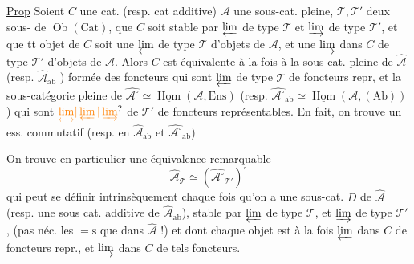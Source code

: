 \uline{Prop} Soient $C$ une cat. (resp. cat
additive) $\mathcal A$ une sous-cat. pleine,
$\mathcal T,\mathcal T'$ deux sous-
de $\operatorname{Ob}(\mathrm{Cat})$,  que $C$ soit
stable par $\varprojlim$ de type $\mathcal T$ et $\varinjlim$
de type $\mathcal T'$, et que tt objet de
$C$ soit une $\varprojlim$  de type $\mathcal T$ d'objets
de $\mathcal A$, et une $\varinjlim$ dans $C$ de type $\mathcal T'$
d'objets de $\mathcal A$. Alors $C$ est équivalente
à la fois à la sous cat. pleine
de $\widehat{\mathcal A}$ 
(resp. $\widehat{\mathcal A}_{\mathrm{ab}}$ )
formée des
foncteurs  qui sont $\varprojlim$ 
de type $\mathcal T$ de foncteurs repr,
et  la  sous-catégorie pleine de
$\widehat{\mathcal A^\circ}\simeq\underline{\operatorname{Hom}}(\mathcal A,\mathrm{Ens})$ (resp. $\widehat{\mathcal A^\circ}_{\mathrm{ab}}\simeq
\underline{\operatorname{Hom}}(\mathcal A,(\mathrm{Ab}))$) qui sont 
$\unsure{\underset{\longleftrightarrow}{\lim}|\varprojlim|\varinjlim}$ de  $\mathcal T'$ de foncteurs
représentables.
En fait, on trouve un 
ess. commutatif
(resp. en $\widehat{\mathcal A}_{\mathrm{ab}}$ et $\widehat{\mathcal A^\circ}_{\mathrm{ab}}$)

On trouve en particulier une
équivalence remarquable
\[
 \widehat{\mathcal A}_{\mathcal T}\simeq
 (\widehat{\mathcal A^\circ}_{\mathcal T'})^\circ
\]
qui peut se définir intrinsèquement  chaque fois qu'on a une
sous-cat. $D$ de $\widehat{\mathcal A}$ (resp. une sous cat.
additive de $\widehat{\mathcal A}_{\mathrm{ab}}$), stable  par
$\varprojlim$ de type $\mathcal T$, et  $\varinjlim$ de type $\mathcal T'$,
(pas néc. les $=\mathrm{s}$ que dans $\widehat{\mathcal A}$ !)
et dont chaque objet est à la fois
$\varprojlim$  dans $C$ de foncteurs repr.,
et $\varinjlim$  dans $C$ de tels foncteurs.

